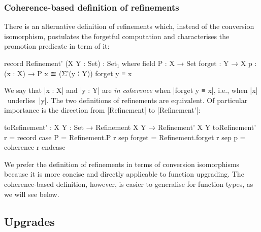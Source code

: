 
\subsubsection{Coherence-based definition of refinements}

There is an alternative definition of refinements which, instead of the conversion isomorphism, postulates the forgetful computation and characterises the promotion predicate in term of it:
\begin{code}
record Refinement' (X Y : Set) : Set₁ where
  field
    P       :  X → Set
    forget  :  Y → X
    p       :  (x : X) → P x ≅ (Σ'(y ∶ Y)) forget y ≡ x
\end{code}
We say that |x : X| and |y : Y| are \emph{in coherence} when |forget y ≡ x|, i.e., when |x|~underlies~|y|.
The two definitions of refinements are equivalent.
Of particular importance is the direction from |Refinement| to |Refinement'|:
\begin{code}
toRefinement' : {X Y : Set} → Refinement X Y → Refinement' X Y
toRefinement' r = record  case  P       =  Refinement.P r
                          sep   forget  =  Refinement.forget r
                          sep   p       =  coherence r endcase
\end{code}
We prefer the definition of refinements in terms of conversion isomorphisms because it is more concise and directly applicable to function upgrading.
The coherence-based definition, however, is easier to generalise for function types, as we will see below.

\subsection{Upgrades}
\label{sec:upgrades}

